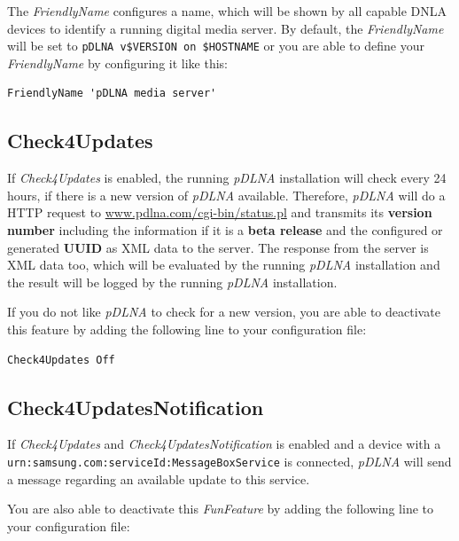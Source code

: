 \documentclass[a4paper,oneside,10pt]{report}
\newenvironment{colframefile}{%
  \begin{Sbox}
    \begin{minipage}{.99\columnwidth}
}{%
  \end{minipage}
  \end{Sbox}
  \begin{center}
    \fcolorbox{black}{Yellow}{\TheSbox}
  \end{center}
}
\begin{document}
The {\em FriendlyName} configures a name, which will be shown by all capable DNLA devices to identify a running digital media server. By default, the {\em FriendlyName} will be set to \verb|pDLNA v$VERSION on $HOSTNAME| or you are able to define your {\em FriendlyName} by configuring it like this:

\begin{colframefile}
\begin{verbatim}
FriendlyName 'pDLNA media server'
\end{verbatim}
\end{colframefile}

\subsection{Check4Updates}
\label{config-check4updates}

If {\em Check4Updates} is enabled, the running {\em pDLNA} installation will check every 24 hours, if there is a new version of {\em pDLNA} available. Therefore, {\em pDLNA} will do a HTTP request to \url{www.pdlna.com/cgi-bin/status.pl} and transmits its \textbf{version number} including the information if it is a \textbf{beta release} and the configured or generated \textbf{UUID} as XML data to the server. The response from the server is XML data too, which will be evaluated by the running {\em pDLNA} installation and the result will be logged by the running {\em pDLNA} installation.

If you do not like {\em pDLNA} to check for a new version, you are able to deactivate this feature by adding the following line to your configuration file:

\begin{colframefile}
\begin{verbatim}
Check4Updates Off
\end{verbatim}
\end{colframefile}

\subsection{Check4UpdatesNotification}
\label{config-check4updatesnotification}

If {\em Check4Updates} and {\em Check4UpdatesNotification} is enabled and a device with a \verb|urn:samsung.com:serviceId:MessageBoxService| is connected, {\em pDLNA} will send a message regarding an available update to this service.

You are also able to deactivate this {\em FunFeature} by adding  the following line to your configuration file:
\end{document}
